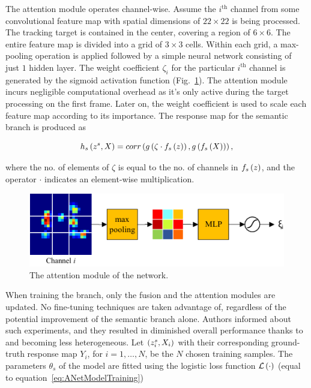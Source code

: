 The attention module operates channel-wise. Assume the $i^{\text{th}}$ channel from some convolutional feature map with spatial dimensions of $22 \times 22$ is being processed. The tracking target is contained in the center, covering a region of $6 \times 6$. The entire feature map is divided into a grid of $3 \times 3$ cells. Within each grid, a max-pooling operation is applied followed by a simple neural network consisting of just $1$ hidden layer. The weight coefficient $\zeta_i$ for the particular $i^{\text{th}}$ channel is generated by the sigmoid activation function (Fig.~\ref{fig:TwofoldSiameseNetAttentionModule}). The attention module incurs negligible computational overhead as it's only active during the target processing on the first frame. Later on, the weight coefficient is used to scale each feature map according to its importance. The response map for the semantic branch is produced as

\begin{equation}
    {h_s} \left( z^s, X \right) =
    {corr} \left( 
        {g} \left( \zeta \cdot {f_s} \left( z \right) \right),
        {g} \left( {f_s} \left( X \right) \right)
     \right),
\end{equation}

\noindent where the no. of elements of $\zeta$ is equal to the no. of channels in ${f_s} \left( z \right)$, and the operator $\cdot$ indicates an element-wise multiplication.

\begin{figure}[t]
    \centerline{\includegraphics[width=0.6\linewidth]{figures/theoretical_foundations/twofold_siamese_net_attention_module.pdf}}
    \caption[ attention module]{The attention module of the  network. }
    \label{fig:TwofoldSiameseNetAttentionModule}
\end{figure}

When training the  branch, only the fusion and the attention modules are updated. No fine-tuning techniques are taken advantage of, regardless of the potential improvement of the semantic branch alone. Authors informed about such experiments, and they resulted in diminished overall performance thanks to  and  becoming less heterogeneous. Let $\left( {{z}_{i}^{s}, X_i} \right)$ with their corresponding ground-truth response map $Y_i$, for $i = 1, \dots, N$, be the $N$ chosen training samples. The parameters $\theta_s$ of the  model are fitted using the logistic loss function ${\mathcal{L}} \left( \cdot \right)$ (equal to equation~\ref{eq:ANetModelTraining})

